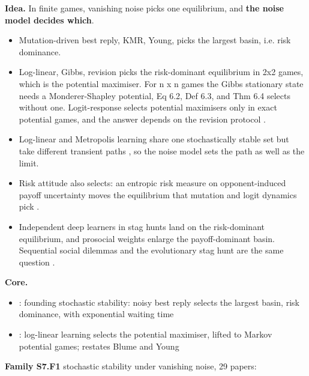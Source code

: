 \documentclass[10pt]{article}
\newcommand{\memb}[1]{\par\smallskip\textbf{#1}\quad}
\begin{document}
\textbf{Idea.} In finite games, vanishing noise picks one equilibrium, and \textbf{the noise model decides which}.
\begin{itemize}[nosep,leftmargin=1.2em]
\item Mutation-driven best reply, KMR, Young, picks the largest basin, i.e. risk dominance.
\item Log-linear, Gibbs, revision picks the risk-dominant equilibrium in 2x2 games, which is the potential maximiser. For n x n games the Gibbs stationary state needs a Monderer-Shapley potential, \citet{Blume-statistical93} Eq 6.2, Def 6.3, and Thm 6.4 selects without one. Logit-response selects potential maximisers only in exact potential games, and the answer depends on the revision protocol \citep{AlosFerrer-logit10}.
\item Log-linear and Metropolis learning share one stochastically stable set but take different transient paths \citep{Jaleel-path18}, so the noise model sets the path as well as the limit.
\item Risk attitude also selects: an entropic risk measure on opponent-induced payoff uncertainty moves the equilibrium that mutation and logit dynamics pick \citep{Mohammadi-entropic26}.
\item Independent deep learners in stag hunts land on the risk-dominant equilibrium, and prosocial weights enlarge the payoff-dominant basin. Sequential social dilemmas and the evolutionary stag hunt are the same question \citep{Leibo-multi17,Bulbulia-spreading11}.
\end{itemize}


\memb{Core.}
\begin{itemize}[nosep,leftmargin=1.2em]
\item \citet{Kandori-learning93}: founding stochastic stability: noisy best reply selects the largest basin, risk dominance, with exponential waiting time
\item \citet{Zhang-equilibrium24}: log-linear learning selects the potential maximiser, lifted to Markov potential games; restates Blume and Young
\end{itemize}
\memb{Family S7.F1} stochastic stability under vanishing noise, 29 papers: {\footnotesize \citetext{\citealp{Kandori-learning93}; \citealp{Foster-stochastic90}; \citealp{Blume-statistical93}; \citealp{Young-evolution93}; \citealp{Marden-revisiting12}; \citealp{Borowski-fast17}; \citealp{Ellison-learning93}\dag; \citealp{Blume-statistical95}; \citealp{Kandori-evolution95}; \citealp{Bergin-evolution96}; \citealp{Rhode-comment96}\dag; \citealp{Robson-efficient96}\dag; \citealp{Binmore-muddling97}; \citealp{Young-individual98}\dag; \citealp{Ellison-basins00}\dag; \citealp{Anderson-minimum01}; \citealp{Miekisz-stochastic04}; \citealp{AlosFerrer-logit10}; \citealp{Okada-loglinear12}; \citealp{Chasparis-stochastic17}; \citealp{Lahkar-equilibrium17}\dag; \citealp{Tatarenko-logit17}; \citealp{Hasanbeig-game18}; \citealp{Jaleel-path18}; \citealp{NaleczJawecki-mean18}; \citealp{Tatarenko-independent18}; \citealp{Staudigl-large22}; \citealp{Mukhopadhyay-analogies25}; \citealp{Mohammadi-entropic26}}}
\end{document}
